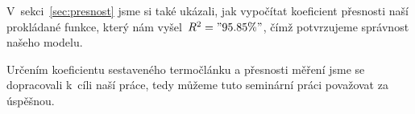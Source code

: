 V~sekci~\ref{sec:presnost} jsme si také ukázali, jak vypočítat koeficient
přesnosti naší prokládané funkce, který nám vyšel~$R^2="95.85 \%"$, čímž
potvrzujeme správnost našeho modelu.

Určením koeficientu sestaveného termočlánku a přesnosti měření jsme se
dopracovali k~cíli naší práce, tedy můžeme tuto seminární práci považovat za
úspěšnou.
